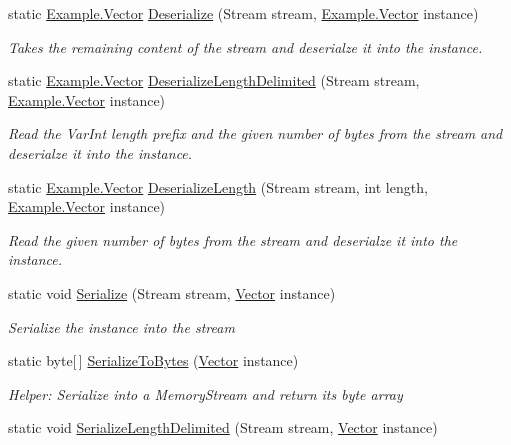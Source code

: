 \begin{DoxyCompactItemize}
static \hyperlink{class_example_1_1_vector}{Example.\+Vector} \hyperlink{class_example_1_1_vector_a1eaf2f0f8c1289888fa799ad8c16fa21}{Deserialize} (Stream stream, \hyperlink{class_example_1_1_vector}{Example.\+Vector} instance)
\begin{DoxyCompactList}\small\item\em Takes the remaining content of the stream and deserialze it into the instance.\end{DoxyCompactList}\item 
static \hyperlink{class_example_1_1_vector}{Example.\+Vector} \hyperlink{class_example_1_1_vector_a3092148f5634ca0cc425bcb6f83c5533}{Deserialize\+Length\+Delimited} (Stream stream, \hyperlink{class_example_1_1_vector}{Example.\+Vector} instance)
\begin{DoxyCompactList}\small\item\em Read the Var\+Int length prefix and the given number of bytes from the stream and deserialze it into the instance.\end{DoxyCompactList}\item 
static \hyperlink{class_example_1_1_vector}{Example.\+Vector} \hyperlink{class_example_1_1_vector_aa5e9f156e0489ef1c5bc9578dfd545a1}{Deserialize\+Length} (Stream stream, int length, \hyperlink{class_example_1_1_vector}{Example.\+Vector} instance)
\begin{DoxyCompactList}\small\item\em Read the given number of bytes from the stream and deserialze it into the instance.\end{DoxyCompactList}\item 
static void \hyperlink{class_example_1_1_vector_af60b9bcba3c2dddfc4ef780c5d2786c6}{Serialize} (Stream stream, \hyperlink{class_example_1_1_vector}{Vector} instance)
\begin{DoxyCompactList}\small\item\em Serialize the instance into the stream\end{DoxyCompactList}\item 
static byte\mbox{[}$\,$\mbox{]} \hyperlink{class_example_1_1_vector_aae89c55b304738980925ebbcfdbfa946}{Serialize\+To\+Bytes} (\hyperlink{class_example_1_1_vector}{Vector} instance)
\begin{DoxyCompactList}\small\item\em Helper\+: Serialize into a Memory\+Stream and return its byte array\end{DoxyCompactList}\item 
static void \hyperlink{class_example_1_1_vector_ad5dad3812b90c5fe6669407f8588fbf5}{Serialize\+Length\+Delimited} (Stream stream, \hyperlink{class_example_1_1_vector}{Vector} instance)

\end{DoxyCompactItemize}
